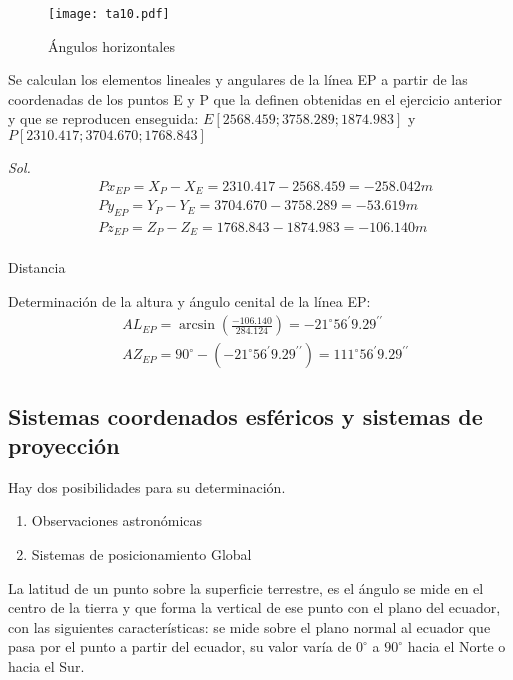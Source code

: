\begin{figure}[h!]
    \centerline{\texttt{[image: ta10.pdf]}}
    \caption{Ángulos horizontales}
    \label{ta10}
  \end{figure}

\begin{example}
    Se calculan los elementos lineales y angulares de la línea EP a partir de las coordenadas de los puntos E y P que la definen obtenidas en el ejercicio anterior y que se reproducen enseguida: $E\left[2568.459;3758.289;1874.983\right]$ y $P\left[2310.417;3704.670;1768.843\right]$
\end{example}

\textit{ Sol. }
\begin{align*}
    &Px_{EP}=X_P-X_E=2310.417-2568.459=-258.042m\\
    &Py_{EP}=Y_P-Y_E=3704.670-3758.289=-53.619m\\
    &Pz_{EP}=Z_P-Z_E=1768.843-1874.983=-106.140m\\
\end{align*}

Distancia 

Determinación de la altura y ángulo cenital de la línea EP: 
\begin{align*}
    &AL_{EP}=\arcsin{\left(\frac{-106.140}{284.124}\right)}=-21^{\circ}56^{\prime}9.29^{\prime\prime}\\
    &AZ_{EP}=90^{\circ}-\left(-21^{\circ}56^{\prime}9.29^{\prime\prime} \right)=111^{\circ}56^{\prime}9.29^{\prime\prime}
\end{align*}

\subsection{Sistemas coordenados esféricos y sistemas de proyección}

Hay dos posibilidades para su determinación. 

\begin{enumerate}
    \item Observaciones astronómicas
    \item Sistemas de posicionamiento Global
\end{enumerate}
\newpage
\begin{definition}
    La latitud de un punto sobre la superficie terrestre, es el ángulo se mide en el centro de la tierra y que forma la vertical de ese punto con el plano del ecuador, con las siguientes características: se mide sobre el plano normal al ecuador que pasa por el punto a partir del ecuador, su valor varía de $0^{\circ}$ a $90^{\circ}$ hacia el Norte o hacia el Sur.
\end{definition}

